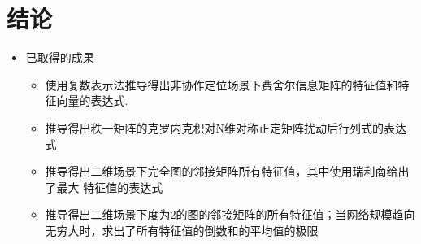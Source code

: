\section{结论}

  \begin{itemize}
  \item
    已取得的成果
  \begin{itemize}
  \item
    使用复数表示法推导得出非协作定位场景下费舍尔信息矩阵的特征值和特征向量的表达式.
  \item
    推导得出秩一矩阵的克罗内克积对N维对称正定矩阵扰动后行列式的表达式
  \item
    推导得出二维场景下完全图的邻接矩阵所有特征值，其中使用瑞利商给出了最大 特征值的表达式
    \item 推导得出二维场景下度为2的图的邻接矩阵的所有特征值；当网络规模趋向无穷大时，求出了所有特征值的倒数和的平均值的极限
  \end{itemize}
  \end{itemize}
